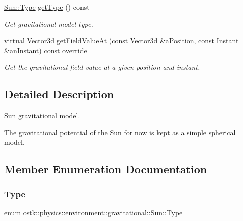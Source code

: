 \begin{DoxyCompactItemize}
\hyperlink{classostk_1_1physics_1_1environment_1_1gravitational_1_1_sun_ae567145f71c7750a9e4e43a309bd19db}{Sun\+::\+Type} \hyperlink{classostk_1_1physics_1_1environment_1_1gravitational_1_1_sun_ac79af34fa7adcb7340b86a059b7585e8}{get\+Type} () const
\begin{DoxyCompactList}\small\item\em Get gravitational model type. \end{DoxyCompactList}\item 
virtual Vector3d \hyperlink{classostk_1_1physics_1_1environment_1_1gravitational_1_1_sun_ac8aac491e31bde1690f5d85c7c5fe590}{get\+Field\+Value\+At} (const Vector3d \&a\+Position, const \hyperlink{classostk_1_1physics_1_1time_1_1_instant}{Instant} \&an\+Instant) const override
\begin{DoxyCompactList}\small\item\em Get the gravitational field value at a given position and instant. \end{DoxyCompactList}\end{DoxyCompactItemize}


\subsection{Detailed Description}
\hyperlink{classostk_1_1physics_1_1environment_1_1gravitational_1_1_sun}{Sun} gravitational model. 

The gravitational potential of the \hyperlink{classostk_1_1physics_1_1environment_1_1gravitational_1_1_sun}{Sun} for now is kept as a simple spherical model. 

\subsection{Member Enumeration Documentation}
\mbox{\label{classostk_1_1physics_1_1environment_1_1gravitational_1_1_sun_ae567145f71c7750a9e4e43a309bd19db}} 
\subsubsection{\texorpdfstring{Type}{Type}}
{\footnotesize\ttfamily enum \hyperlink{classostk_1_1physics_1_1environment_1_1gravitational_1_1_sun_ae567145f71c7750a9e4e43a309bd19db}{ostk\+::physics\+::environment\+::gravitational\+::\+Sun\+::\+Type}\hspace{0.3cm}{\ttfamily [strong]}}

